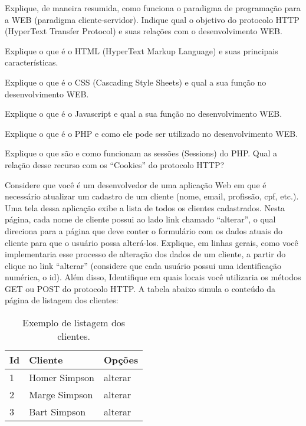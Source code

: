 \documentclass[a4paper, 12pt, addpoints]{cls/exam}
\begin{document}
\begin{questions}

\question[1] Explique, de maneira resumida, como funciona o paradigma de programação para a WEB (paradigma cliente-servidor). Indique qual o objetivo do protocolo HTTP (HyperText Transfer Protocol) e suas relações com o desenvolvimento WEB.

\question[1] Explique o que é o HTML (HyperText Markup Language) e suas principais características.

\question[1] Explique o que é o CSS (Cascading Style Sheets) e qual a sua função no desenvolvimento WEB.

\question[1] Explique o que é o Javascript e qual a sua função no desenvolvimento WEB.

\question[1] Explique o que é o PHP e como ele pode ser utilizado no desenvolvimento WEB.

\question[2] Explique o que são e como funcionam as sessões (Sessions) do PHP. Qual a relação desse recurso com os “Cookies” do protocolo HTTP?

\question[3] Considere que você é um desenvolvedor de uma aplicação Web em que é necessário atualizar um cadastro de um cliente (nome, email, profissão, cpf, etc.). Uma tela dessa aplicação exibe a lista de todos os clientes cadastrados. Nesta página, cada nome de cliente possui ao lado link chamado “alterar”, o qual direciona para a página que deve conter o formulário com os dados atuais do cliente para que o usuário possa alterá-los. Explique, em linhas gerais, como você implementaria esse processo de alteração dos dados de um cliente, a partir do clique no link “alterar” (considere que cada usuário possui uma identificação numérica, o id). Além disso, Identifique em quais locais você utilizaria os métodos GET ou POST do protocolo HTTP. A tabela abaixo simula o conteúdo da página de listagem dos clientes:

\begin{table}[H]
\centering
\caption{Exemplo de listagem dos clientes.}
\label{my-label}
\begin{tabular}{@{}lll@{}}
\toprule
Id & Cliente       & Opções  \\ \midrule
1  & Homer Simpson & alterar \\
2  & Marge Simpson & alterar \\
3  & Bart Simpson  & alterar \\ \bottomrule
\end{tabular}
\end{table}


\end{questions}
\end{document}
